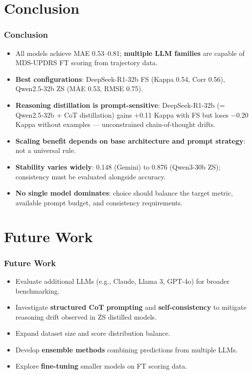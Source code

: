\documentclass[aspectratio=169]{beamer}
\begin{document}
\section{Conclusion}

\begin{frame}
    \frametitle{Conclusion}
    \begin{itemize}
        \item All models achieve MAE 0.53--0.81; \textbf{multiple LLM families} are capable of MDS-UPDRS FT scoring from trajectory data.
        \item \textbf{Best configurations}: DeepSeek-R1-32b FS (Kappa 0.54, Corr 0.56), Qwen2.5-32b ZS (MAE 0.53, RMSE 0.75).
        \item \textbf{Reasoning distillation is prompt-sensitive}: DeepSeek-R1-32b (= Qwen2.5-32b + CoT distillation) gains $+$0.11 Kappa with FS but loses $-$0.20 Kappa without examples --- unconstrained chain-of-thought drifts.
        \item \textbf{Scaling benefit depends on base architecture and prompt strategy}: not a universal rule.
        \item \textbf{Stability varies widely}: 0.148 (Gemini) to 0.876 (Qwen3-30b ZS); consistency must be evaluated alongside accuracy.
        \item \textbf{No single model dominates}: choice should balance the target metric, available prompt budget, and consistency requirements.
    \end{itemize}
\end{frame}


\section{Future Work}

\begin{frame}
    \frametitle{Future Work}
    \begin{itemize}
        \item Evaluate additional LLMs (e.g., Claude, Llama 3, GPT-4o) for broader benchmarking.
        \item Investigate \textbf{structured CoT prompting} and \textbf{self-consistency} to mitigate reasoning drift observed in ZS distilled models.
        \item Expand dataset size and score distribution balance.
        \item Develop \textbf{ensemble methods} combining predictions from multiple LLMs.
        \item Explore \textbf{fine-tuning} smaller models on FT scoring data.
    \end{itemize}
\end{frame}
\end{document}
